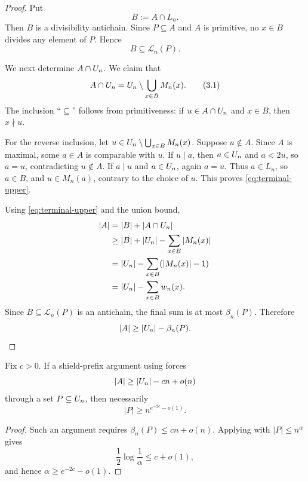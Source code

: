 \begin{proof}
Put
\[
  B:=A\cap L_n.
\]
Then $B$ is a divisibility antichain.  Since $P\subseteq A$ and $A$ is
primitive, no $x\in B$ divides any element of $P$.  Hence
\[
  B\subseteq \mathcal L_n(P).
\]

We next determine $A\cap U_n$.  We claim that
\[
  A\cap U_n
  =
  U_n\setminus \bigcup_{x\in B}M_n(x).
  \tag{3.1}\label{eq:terminal-upper}
\]
The inclusion ``$\subseteq$'' follows from primitiveness: if
$u\in A\cap U_n$ and $x\in B$, then $x\nmid u$.

For the reverse inclusion, let
$u\in U_n\setminus \bigcup_{x\in B}M_n(x)$.  Suppose $u\notin A$.  Since $A$
is maximal, some $a\in A$ is comparable with $u$.  If $u\mid a$, then
$a\in U_n$ and $a<2u$, so $a=u$, contradicting $u\notin A$.  If $a\mid u$ and
$a\in U_n$, again $a=u$.  Thus $a\in L_n$, so $a\in B$, and $u\in M_n(a)$,
contrary to the choice of $u$.  This proves \eqref{eq:terminal-upper}.

Using \eqref{eq:terminal-upper} and the union bound,
\[
\begin{aligned}
  |A|
  &= |B|+|A\cap U_n|  \\
  &\ge |B|+|U_n|-\sum_{x\in B}|M_n(x)|\\
  &= |U_n|-\sum_{x\in B}(|M_n(x)|-1)\\
  &= |U_n|-\sum_{x\in B}w_n(x).
\end{aligned}
\]
Since $B\subseteq\mathcal L_n(P)$ is an antichain, the final sum is at most
$\beta_n(P)$.  Therefore
\[
  |A|\ge |U_n|-\beta_n(P).
\]
\end{proof}

\begin{corollary}\label{cor:shield-obstruction}
Fix $c>0$.  If a shield-prefix argument using 
forces
\[
  |A|\ge |U_n|-cn+o(n)
\]
through a set $P\subseteq U_n$, then necessarily
\[
  |P|\ge n^{e^{-2c}-o(1)}.
\]
\end{corollary}

\begin{proof}
Such an argument requires $\beta_n(P)\le cn+o(n)$.  Applying
 with $|P|\le n^\alpha$ gives
\[
  \frac12\log\frac1\alpha\le c+o(1),
\]
and hence $\alpha\ge e^{-2c}-o(1)$.
\end{proof}
